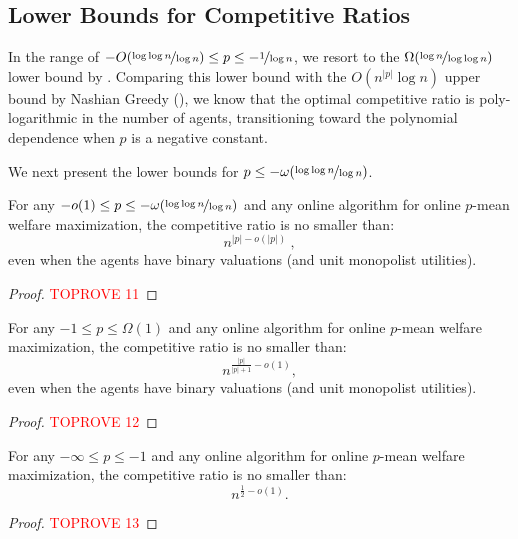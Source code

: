\documentclass[11pt,letterpaper]{article}
\begin{document}
\subsection{Lower Bounds for Competitive Ratios}

In the range of $-O(\nicefrac{\log\log n}{\log n}) \le p \le - \nicefrac{1}{\log n}$, we resort to the $\Omega(\nicefrac{\log n}{\log \log n})$ lower bound by .
Comparing this lower bound with the $O(n^{|p|}\log n)$ upper bound by Nashian Greedy (), we know that the optimal competitive ratio is poly-logarithmic in the number of agents, transitioning toward the polynomial dependence when $p$ is a negative constant.

We next present the lower bounds for $p \le - \omega(\nicefrac{\log\log n}{\log n})$.
\begin{theorem}
	\label{thm:hardness-negative-almost-nashian}
	For any $-o(1) \le	p \le - \omega(\nicefrac{\log\log n}{\log n})$ and any online algorithm for online $p$-mean welfare maximization, the competitive ratio is no smaller than:
    \[
    	n^{|p| - o(|p|)}
    	~,
    \]
    even when the agents have binary valuations (and unit monopolist utilities).
\end{theorem}

\begin{proof}\textcolor{red}{TOPROVE 11}\end{proof}




\begin{theorem}
	\label{thm:hardness-nashian-to-harmonic}
	For any $-1 \le p \le \Omega(1)$ and any online algorithm for online $p$-mean welfare maximization, the competitive ratio is no smaller than:
	\[
		n^{\frac{|p|}{|p|+1}-o(1)}
        ,
	\]
    even when the agents have binary valuations (and unit monopolist utilities).
\end{theorem}

\begin{proof}\textcolor{red}{TOPROVE 12}\end{proof}

\begin{theorem}
	\label{thm:hardness-harmonic-to-egalitarian}
	For any $-\infty \le p \le -1$ and any online algorithm for online $p$-mean welfare maximization, the competitive ratio is no smaller than:
	\[
		n^{\frac{1}{2}-o(1)}
        .
	\]
\end{theorem}

\begin{proof}\textcolor{red}{TOPROVE 13}\end{proof}
\end{document}
